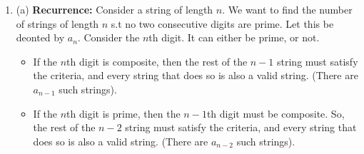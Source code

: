 \documentclass[a4paper]{article}
\begin{document}
\begin{enumerate}
(c) \textbf{Generating Function:} We can get the generating function for the recurrence relation as follows:
\begin{align*}
    A(x) &= \sum_{n\geq 0} a_n x^n = \sum_{n \geq 2} (2a_{n-1}+2^{n-2}-a_{n-2})x^n + a_0 + a_1 x\\
    &= 2x(\sum_{n \geq 1} a_n x^n) + x^2(\sum_{n \geq 0} 2^n x^n) - x^2(\sum_{n \geq 0} a_n x^n)\\
    &= 2x(A(x)) + \frac{x^2}{1 - 2x} - x^2(A(x))
        \end{align*}
$A(x)(1-2x+x^2) = \frac{x^2}{1 - 2x}$
$$A(x) = \frac{x^2}{(1-2x)(1-2x+x^2)}=\frac{(1-2x+x^2) - (1-2x)}{(1-2x)(1-2x+x^2)} = \frac{1}{1-2x} - \frac{1}{(1-x)^2}$$
$=\sum_{n \geq 0} (2x)^n - \sum_{n \geq 0} {(n+1) x^n} = \sum_{n \geq 0} (2^n - n - 1)x^n$\\

So, in closed form, we get::
$a_n = 2^n - n - 1$\\

(d) Verifying for $n=4$. By our formula, we get $a_4 = 2^4 - 4- 1 = 11$. All the possible strings of length 4 are (invalid ones are highlighted red):
\begin{alignat*}{3}
    \color{red}{0000} & \ \ \ \color{red}{0001}&  \ \ \  0010 &  \ \ \  \color{red}{0011}\\
    0100 & \ \ \ 0101&  \ \ \  0110 &  \ \ \  \color{red}{0111}\\
    1000 & \ \ \ 1001&  \ \ \  1010 &  \ \ \  1011\\
    1100 & \ \ \ 1101&  \ \ \  1110 &  \ \ \  \color{red}{1111}
\end{alignat*}

There are 11 strings that contain the substring "10". Thus, our formula is correct.

\newpage

\item (a) \textbf{Recurrence:} Consider a string of length $n$. We want to find the number of strings of length $n$ s.t no two consecutive digits are prime. Let this be deonted by $a_n$. Consider the $n$th digit. It can either be prime, or not.
\begin{itemize}
    \item If the $n$th digit is composite, then the rest of the $n-1$ string must satisfy the criteria, and every string that does so is also a valid string. (There are $a_{n-1}$ such strings).
    \item If the $n$th digit is prime, then the $n-1$th digit must be composite. So, the rest of the $n-2$ string must satisfy the criteria, and every string that does so is also a valid string. (There are $a_{n-2}$ such strings).
\end{itemize}


\end{enumerate}
\end{document}
